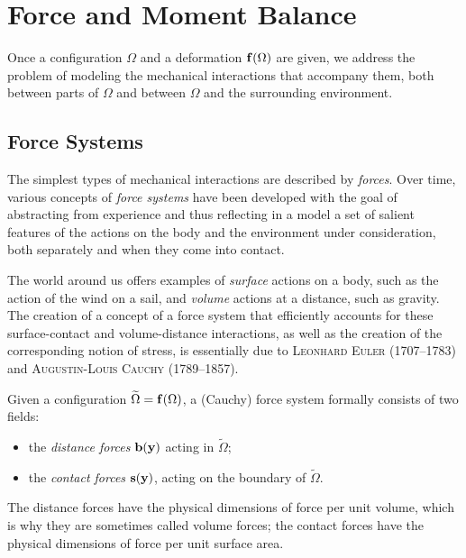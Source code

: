 \chapter{Force and Moment Balance}


Once a configuration $\Omega$ and a deformation $\mathbf{f}(\Omega)$ are given, we address the problem of modeling the mechanical interactions that accompany them, both between parts of $\Omega$ and between $\Omega$ and the surrounding environment.

\section{Force Systems}

The simplest types of mechanical interactions are described by \textit{forces}. Over time, various concepts of \textit{force systems} have been developed with the goal of abstracting from experience and thus reflecting in a model a set of salient features of the actions on the body and the environment under consideration, both separately and when they come into contact.

The world around us offers examples of \textit{surface} actions on a body, such as the action of the wind on a sail, and \textit{volume} actions at a distance, such as gravity. The creation of a concept of a force system that efficiently accounts for these surface-contact and volume-distance interactions, as well as the creation of the corresponding notion of stress, is essentially due to \textsc{Leonhard Euler} (1707--1783) and \textsc{Augustin-Louis Cauchy} (1789--1857).

Given a configuration $\widetilde{\Omega}=\mathbf{f}(\Omega)$, a (Cauchy) force system formally consists of two fields:
\begin{itemize}
	\item the \textit{distance forces} $\mathbf{b}(\mathbf{y})$ acting in $\widetilde\Omega$;
	\item the \textit{contact forces} $\mathbf{s}(\mathbf{y})$, acting on the boundary of $\widetilde\Omega$.
\end{itemize}
The distance forces have the physical dimensions of force per unit volume, which is why they are sometimes called volume forces; the contact forces have the physical dimensions of force per unit surface area.

